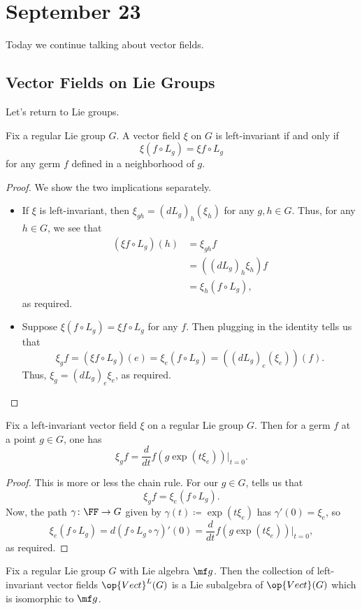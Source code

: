 \documentclass[../notes.tex]{subfiles}
\begin{document}
\section{September 23}
Today we continue talking about vector fields.

\subsection{Vector Fields on Lie Groups}
Let's return to Lie groups.
\begin{lemma} \label{lem:left-invariant-by-germ}
	Fix a regular Lie group $G$. A vector field $\xi$ on $G$ is left-invariant if and only if
	\[\xi(f\circ L_g)=\xi f\circ L_g\]
	for any germ $f$ defined in a neighborhood of $g$.
\end{lemma}
\begin{proof}
	We show the two implications separately.
	\begin{itemize}
		\item If $\xi$ is left-invariant, then $\xi_{gh}=(dL_g)_h(\xi_h)$ for any $g,h\in G$. Thus, for any $h\in G$, we see that
		\begin{align*}
			(\xi f\circ L_g)(h) &= \xi_{gh}f \\
			&= ((dL_g)_h\xi_h)f \\
			&= \xi_h(f\circ L_g),
		\end{align*}
		as required.
		\item Suppose $\xi(f\circ L_g)=\xi f\circ L_g$ for any $f$. Then plugging in the identity tells us that
		\[\xi_gf=(\xi f\circ L_g)(e)=\xi_e(f\circ L_g)=((dL_g)_e(\xi_e))(f).\]
		Thus, $\xi_g=(dL_g)_e\xi_e$, as required.
		\qedhere
	\end{itemize}
\end{proof}
\begin{lemma} \label{lem:vector-field-lie-group-action}
	Fix a left-invariant vector field $\xi$ on a regular Lie group $G$. Then for a germ $f$ at a point $g\in G$, one has
	\[\xi_g f=\frac d{dt}f(g\exp(t\xi_e))\bigg|_{t=0}.\]
\end{lemma}
\begin{proof}
	This is more or less the chain rule. For our $g\in G$,  tells us that
	\[\xi_gf=\xi_e(f\circ L_g).\]
	Now, the path $\gamma\colon\FF\to G$ given by $\gamma(t)\coloneqq\exp(t\xi_e)$ has $\gamma'(0)=\xi_e$, so
	\[\xi_e(f\circ L_g)=d(f\circ L_g\circ\gamma)'(0)=\frac d{dt}f(g\exp(t\xi_e))\bigg|_{t=0},\]
	as required.
\end{proof}
\begin{proposition}
	Fix a regular Lie group $G$ with Lie algebra $\mf g$. Then the collection of left-invariant vector fields $\op{Vect}^L(G)$ is a Lie subalgebra of $\op{Vect}(G)$ which is isomorphic to $\mf g$.
\end{proposition}
\end{document}
